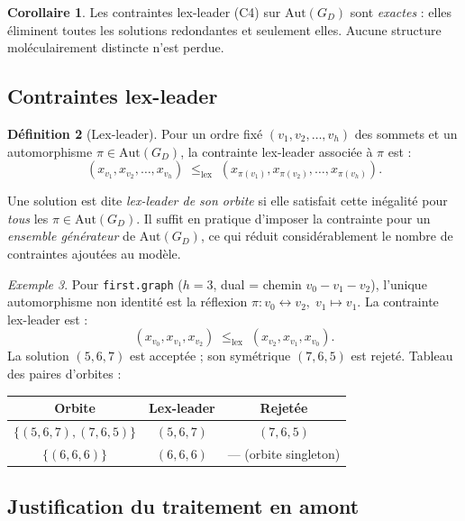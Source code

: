 \documentclass[12pt,a4paper]{article}
\theoremstyle{definition}
\newtheorem{definition}{D\'efinition}[section]
\newtheorem{corollaire}[definition]{Corollaire}
\theoremstyle{remark}
\newtheorem{exemple}[definition]{Exemple}
\newcommand{\GD}{G_{\!D}}
\newcommand{\Aut}{\mathrm{Aut}}
\begin{document}
\begin{corollaire}
Les contraintes lex-leader (C4) sur $\Aut(\GD)$ sont \emph{exactes} :
elles \'eliminent toutes les solutions redondantes et seulement elles.
Aucune structure mol\'eculairement distincte n'est perdue.
\end{corollaire}

\subsection{Contraintes lex-leader}

\begin{definition}[Lex-leader]
Pour un ordre fix\'e $(v_1, v_2, \ldots, v_h)$ des sommets et un
automorphisme $\pi \in \Aut(\GD)$, la contrainte lex-leader associ\'ee
\`a $\pi$ est :
\[
  (x_{v_1}, x_{v_2}, \ldots, x_{v_h})
  \;\leq_{\mathrm{lex}}\;
  (x_{\pi(v_1)}, x_{\pi(v_2)}, \ldots, x_{\pi(v_h)}).
\]
\end{definition}

Une solution est dite \emph{lex-leader de son orbite} si elle satisfait
cette in\'egalit\'e pour \emph{tous} les $\pi \in \Aut(\GD)$. Il suffit
en pratique d'imposer la contrainte pour un \emph{ensemble g\'en\'erateur}
de $\Aut(\GD)$, ce qui r\'eduit consid\'erablement le nombre de
contraintes ajout\'ees au mod\`ele.

\begin{exemple}
Pour \texttt{first.graph} ($h = 3$, dual = chemin $v_0 - v_1 - v_2$),
l'unique automorphisme non identit\'e est la r\'eflexion
$\pi : v_0 \leftrightarrow v_2,\; v_1 \mapsto v_1$. La contrainte
lex-leader est :
\[
  (x_{v_0}, x_{v_1}, x_{v_2}) \;\leq_{\mathrm{lex}}\;
  (x_{v_2}, x_{v_1}, x_{v_0}).
\]
La solution $(5, 6, 7)$ est accept\'ee ; son sym\'etrique $(7, 6, 5)$ est
rejet\'e. Tableau des paires d'orbites :
\begin{center}
\renewcommand{\arraystretch}{1.2}
\begin{tabular}{ccc}
\toprule
Orbite & Lex-leader & Rejet\'ee \\
\midrule
$\{(5,6,7), (7,6,5)\}$ & $(5,6,7)$ & $(7,6,5)$ \\
$\{(6,6,6)\}$ & $(6,6,6)$ & --- (orbite singleton) \\
\bottomrule
\end{tabular}
\end{center}
\end{exemple}

\subsection{Justification du traitement en amont}
\end{document}
